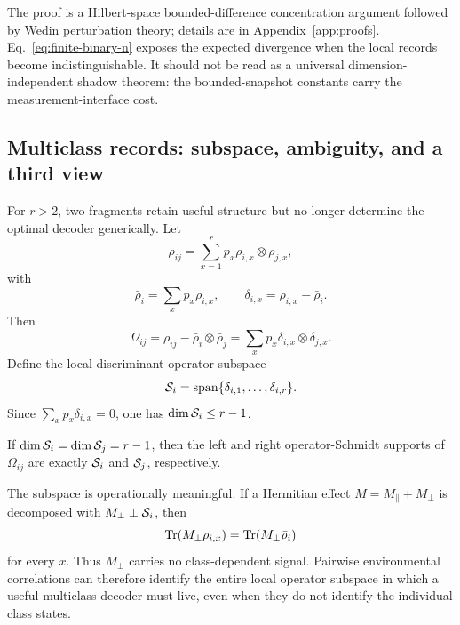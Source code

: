 The proof is a Hilbert-space bounded-difference concentration argument followed by Wedin perturbation theory; details are in Appendix~\ref{app:proofs}.  Eq.~\eqref{eq:finite-binary-n} exposes the expected divergence when the local records become indistinguishable.  It should not be read as a universal dimension-independent shadow theorem: the bounded-snapshot constants carry the measurement-interface cost.

\subsection{Multiclass records: subspace, ambiguity, and a third view}
\label{sec:multiclass}

For $r>2$, two fragments retain useful structure but no longer determine the optimal decoder generically.  Let
\begin{equation}
\rho_{ij}=\sum_{x=1}^{r}p_x\rho_{i,x}\otimes\rho_{j,x},
\end{equation}
with
\begin{equation}
\bar\rho_i=\sum_xp_x\rho_{i,x},\qquad
\delta_{i,x}=\rho_{i,x}-\bar\rho_i.
\end{equation}
Then
\begin{equation}
\Omega_{ij}=\rho_{ij}-\bar\rho_i\otimes\bar\rho_j
=\sum_xp_x\delta_{i,x}\otimes\delta_{j,x}.
\label{eq:multi-connected}
\end{equation}
Define the local discriminant operator subspace
\begin{equation}
\mathcal S_i=\operatorname{span}\{\delta_{i,1},\ldots,\delta_{i,r}\}.
\end{equation}
Since $\sum_xp_x\delta_{i,x}=0$, one has $\dim\mathcal S_i\le r-1$.

\begin{theorem}
\label{thm:subspace}
If $\dim\mathcal S_i=\dim\mathcal S_j=r-1$, then the left and right operator-Schmidt supports of $\Omega_{ij}$ are exactly $\mathcal S_i$ and $\mathcal S_j$, respectively.
\end{theorem}

The subspace is operationally meaningful.  If a Hermitian effect $M=M_{\parallel}+M_{\perp}$ is decomposed with $M_{\perp}\perp\mathcal S_i$, then
\begin{equation}
\operatorname{Tr}(M_{\perp}\rho_{i,x})=\operatorname{Tr}(M_{\perp}\bar\rho_i)
\end{equation}
for every $x$.  Thus $M_{\perp}$ carries no class-dependent signal.  Pairwise environmental correlations can therefore identify the entire local operator subspace in which a useful multiclass decoder must live, even when they do not identify the individual class states.

